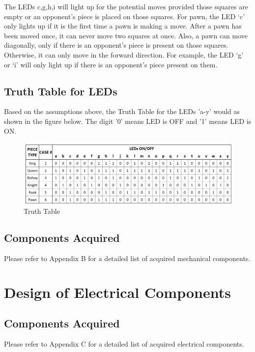 \documentclass[12pt, titlepage]{article}
\begin{document}
\begin{itemize}
  The LEDs c,g,h,i will light up for the potential moves provided those squares are empty or an opponent’s piece is placed on those squares. For pawn, the LED ‘c’ only 
  lights up if it is the first time a pawn is making a move. After a pawn has been moved once, it can never move two squares at once. Also, a pawn can move diagonally, 
  only if there is an opponent’s piece is present on those squares. Otherwise, it can only move in the forward direction. For example, the LED ‘g’ or ‘i’ will only light 
  up if there is an opponent’s piece present on them. 

  \end{itemize}
  


\subsection*{Truth Table for LEDs}

Based on the assumptions above, the Truth Table for the LEDs 'a-y' would as shown in the figure below. 
The digit '0' means LED is OFF and '1' means LED is ON.

\begin{figure}[h]
  \centering
  \includegraphics[width=1\textwidth]{truth_table}
  \caption{Truth Table}
\end{figure}

\subsection{Components Acquired}
Please refer to Appendix B for a detailed list of acquired mechanical components.

\section{Design of Electrical Components}
\subsection{Components Acquired}
Please refer to Appendix C for a detailed list of acquired electrical components.
\end{document}
